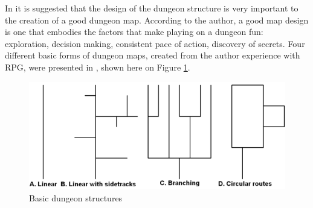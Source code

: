 In \textcite{melan:2006} it is suggested that the design of the dungeon structure is very important to the creation of a good dungeon map. According to the author, a good map design is one that embodies the factors that make playing on a dungeon fun: exploration, decision making, consistent pace of action, discovery of secrets. Four different basic forms of dungeon maps, created from the author experience with RPG, were presented in \textcite{melan:2006},  shown here on Figure \ref{fig:basic_dungeons}. 

\begin{figure}[h]
    \caption{Basic dungeon structures}
    \centerline{\includegraphics[width=13cm]{images/introduction/basic_dungeon.png}}
    \label{fig:basic_dungeons}
\end{figure}



